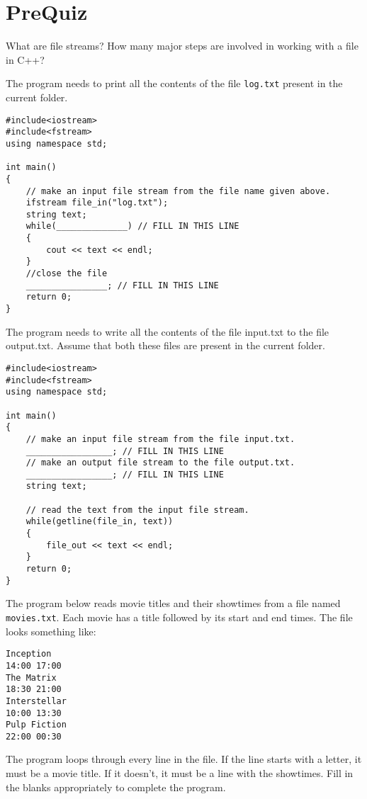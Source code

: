 \section{PreQuiz}

\begin{problem}
    What are file streams? How many major steps are involved in working with a file in C++?
\end{problem}

\begin{problem}
    The program needs to print all the contents of the file \texttt{log.txt} present in the current folder.
\end{problem}

\begin{verbatim}
#include<iostream>
#include<fstream>
using namespace std;

int main() 
{
    // make an input file stream from the file name given above.
    ifstream file_in("log.txt"); 
    string text;  
    while(______________) // FILL IN THIS LINE
    {      
        cout << text << endl;
    }
    //close the file
    ________________; // FILL IN THIS LINE
    return 0;
}
\end{verbatim}


\begin{problem}
    The program needs to write all the contents of the file input.txt to the file output.txt. Assume that both these files are present in the current folder.
\end{problem}

\begin{verbatim}
#include<iostream>
#include<fstream>
using namespace std;

int main() 
{
    // make an input file stream from the file input.txt.
    _________________; // FILL IN THIS LINE
    // make an output file stream to the file output.txt.
    _________________; // FILL IN THIS LINE
    string text; 

    // read the text from the input file stream.
    while(getline(file_in, text))
    {
        file_out << text << endl;
    }
    return 0;
}
\end{verbatim}

\begin{problem}
The program below reads movie titles and their showtimes from a file named \texttt{movies.txt}. Each movie has a title followed by its start and end times. The file looks something like:

\begin{verbatim}
Inception
14:00 17:00
The Matrix
18:30 21:00
Interstellar
10:00 13:30
Pulp Fiction
22:00 00:30
\end{verbatim}

The program loops through every line in the file. If the line starts with a letter, it must be a movie title. If it doesn’t, it must be a line with the showtimes. Fill in the blanks appropriately to complete the program.
\end{problem}


